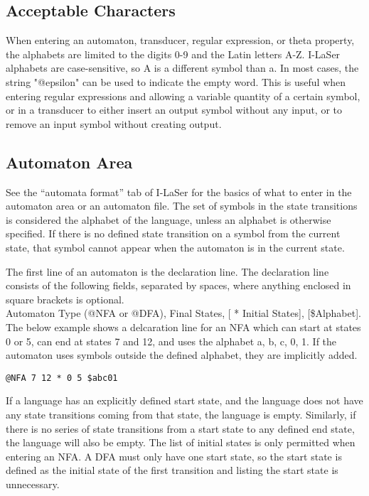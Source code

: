 \documentclass{article}
\begin{document}
\subsection{Acceptable Characters}
When entering an automaton, transducer, regular expression, or theta property, the alphabets are limited to the digits 0-9 and the Latin letters A-Z.
I-LaSer alphabets are case-sensitive, so A is a different symbol than a.
In most cases, the string "@epsilon" can be used to indicate the empty word.
This is useful when entering regular expressions and allowing a variable quantity of a certain symbol, or in a transducer to either insert an output symbol without any input, or to remove an input symbol without creating output.

\subsection{Automaton Area}
See the ``automata format'' tab of I-LaSer for the basics of what to enter in the automaton area or an automaton file. The set of symbols in the state transitions is considered the alphabet of the language, unless an alphabet is otherwise specified. If there is no defined state transition on a symbol from the current state, that symbol cannot appear when the automaton is in the current state.
\par The first line of an automaton is the declaration line. The declaration line consists of the following fields, separated by spaces, where anything enclosed in square brackets is optional.\\
Automaton Type (@NFA or @DFA), Final States, [ * Initial States], [\$Alphabet].
The below example shows a delcaration line for an NFA which can start at states 0 or 5, can end at states 7 and 12, and uses the alphabet {a, b, c, 0, 1}.
If the automaton uses symbols outside the defined alphabet, they are implicitly added. 
\begin{center}
\verb-@NFA 7 12 * 0 5 $abc01-
\end{center}
If a language has an explicitly defined start state, and the language does not have any state transitions coming from that state, the language is empty.
Similarly, if there is no series of state transitions from a start state to any defined end state, the language will also be empty.
The list of initial states is only permitted when entering an NFA.
A DFA must only have one start state, so the start state is defined as the initial state of the first transition and listing the start state is unnecessary. 
\end{document}
